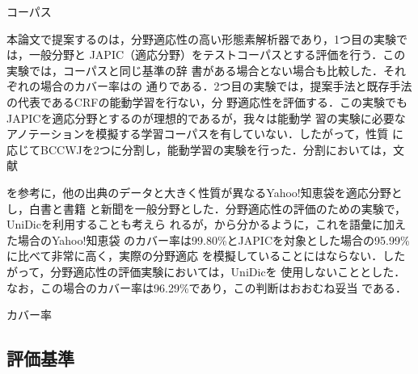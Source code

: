 \documentclass[japanese]{jnlp_1.4}
\def\tabref#1{}
\def\Cite#1{}
\begin{document}
\begin{table}[b]
  \caption{コーパス}

  \label{table:corpus}
\end{table}


本論文で提案するのは，分野適応性の高い形態素解析器であり，1つ目の実験では，一般分野と
JAPIC（適応分野）をテストコーパスとする評価を行う．この実験では，コーパスと同じ基準の辞
書がある場合とない場合も比較した．それぞれの場合のカバー率は\tabref{table:coverage}の
通りである．2つ目の実験では，提案手法と既存手法の代表であるCRFの能動学習を行ない，分
野適応性を評価する．この実験でもJAPICを適応分野とするのが理想的であるが，我々は能動学
習の実験に必要なアノテーションを模擬する学習コーパスを有していない．したがって，性質
に応じてBCCWJを2つに分割し，能動学習の実験を行った．分割においては，文献
\Cite{Design.Compilation.and.Preliminary.Analyses.of.Balanced.Corpus.of.Contemporary.Written.Japanese}
を参考に，他の出典のデータと大きく性質が異なるYahoo!知恵袋を適応分野とし，白書と書籍
と新聞を一般分野とした．分野適応性の評価のための実験で，UniDicを利用することも考えら
れるが，\tabref{table:coverage}から分かるように，これを語彙に加えた場合のYahoo!知恵袋
のカバー率は99.80\%とJAPICを対象とした場合の95.99\%に比べて非常に高く，実際の分野適応
を模擬していることにはならない．したがって，分野適応性の評価実験においては，UniDicを
使用しないこととした．なお，この場合のカバー率は96.29\%であり，この判断はおおむね妥当
である．

\begin{table}[t]
  \caption{カバー率}

  \label{table:coverage}
\end{table}


\subsection{評価基準}
\end{document}
